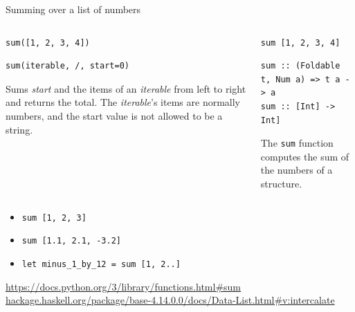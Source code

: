 \documentclass[8pt]{beamer}
\newcommand{\hs}[1]{\texttt{#1}}
\begin{document}
\begin{frame}[fragile]{Summing over a list of numbers}


\begin{columns}%
\begin{column}{.48\textwidth}
\begin{verbatim}
sum([1, 2, 3, 4])
\end{verbatim}
\pause
\begin{verbatim}
sum(iterable, /, start=0)
\end{verbatim}

Sums \emph{start} and the items of an \emph{iterable} from left to right and
returns the total. The \emph{iterable}’s items are normally numbers, and the start
value is not allowed to be a string.

\pause

\end{column}
%
\begin{column}{.48\textwidth}
\begin{verbatim}
sum [1, 2, 3, 4]
\end{verbatim}

\pause
\begin{verbatim}
sum :: (Foldable t, Num a) => t a -> a
sum :: [Int] -> Int]
\end{verbatim}
\pause
The \verb|sum| function computes the sum of the numbers of a structure.

\end{column}
\end{columns}

\pause
\begin{itemize}
    \item \hs{sum [1, 2, 3]} \pause
    \item \hs{sum [1.1, 2.1, -3.2]} \pause
    \item \hs{let minus_1_by_12 = sum [1, 2..]}
\end{itemize}

\pause

{\tiny \url{https://docs.python.org/3/library/functions.html#sum}}
{\tiny \url{hackage.haskell.org/package/base-4.14.0.0/docs/Data-List.html#v:intercalate}}

\end{frame}
\end{document}
